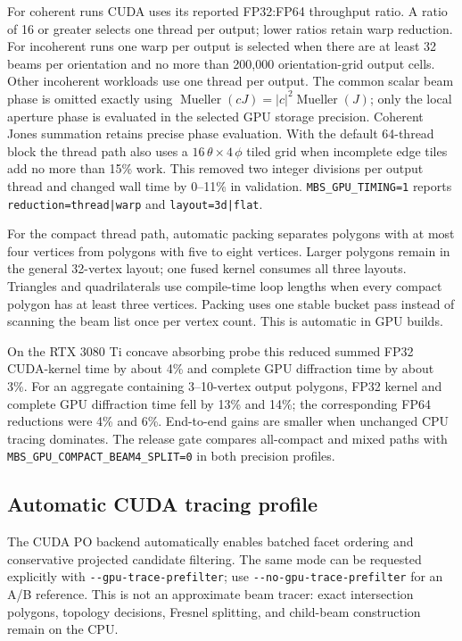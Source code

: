 \documentclass[
  10pt,
  a4paper,
]{article}
\begin{document}
For coherent runs CUDA uses its reported FP32:FP64 throughput ratio. A ratio
of 16 or greater selects one thread per output; lower ratios retain warp
reduction. For incoherent runs one warp per output is selected when there are
at least 32 beams per orientation and no more than 200,000 orientation-grid
output cells. Other incoherent workloads use one thread per output. The common
scalar beam phase is omitted exactly using
$\operatorname{Mueller}(cJ)=|c|^2\operatorname{Mueller}(J)$; only the local
aperture phase is evaluated in the selected GPU storage precision. Coherent
Jones summation retains precise phase evaluation. With the default 64-thread
block the thread path also uses a $16\,\theta\times4\,\phi$ tiled grid when
incomplete edge tiles add no more than 15\% work. This removed two integer
divisions per output thread and changed wall time by 0--11\% in validation.
\texttt{MBS\_GPU\_TIMING=1} reports \texttt{reduction=thread|warp} and
\texttt{layout=3d|flat}.

For the compact thread path, automatic packing separates polygons with at most
four vertices from polygons with five to eight vertices. Larger polygons remain
in the general 32-vertex layout; one fused kernel consumes all three layouts.
Triangles and quadrilaterals use compile-time loop lengths when every compact
polygon has at least three vertices. Packing uses one stable bucket pass instead
of scanning the beam list once per vertex count. This is automatic in GPU builds.

On the RTX 3080 Ti concave absorbing probe this reduced summed FP32 CUDA-kernel
time by about 4\% and complete GPU diffraction time by about 3\%. For an
aggregate containing 3--10-vertex output polygons, FP32 kernel and complete GPU
diffraction time fell by 13\% and 14\%; the corresponding FP64 reductions were
4\% and 6\%. End-to-end gains are smaller when unchanged CPU tracing dominates.
The release gate compares all-compact and mixed paths with
\texttt{MBS\_GPU\_COMPACT\_BEAM4\_SPLIT=0} in both precision profiles.

\subsection{Automatic CUDA tracing profile}

The CUDA PO backend automatically enables batched facet ordering and
conservative projected candidate filtering. The same mode can be requested
explicitly with \nolinkurl{--gpu-trace-prefilter}; use
\nolinkurl{--no-gpu-trace-prefilter} for an A/B reference. This is not an
approximate beam tracer: exact intersection polygons, topology decisions,
Fresnel splitting, and child-beam construction remain on the CPU.
\end{document}
